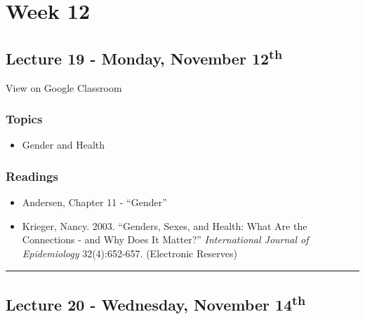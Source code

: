 \documentclass[]{book}
\providecommand{\tightlist}{%
  \setlength{\itemsep}{0pt}\setlength{\parskip}{0pt}}
\theoremstyle{definition}
\theoremstyle{definition}
\theoremstyle{definition}
\theoremstyle{remark}
\begin{document}
\hypertarget{week-12}{%
\section*{Week 12}\label{week-12}}

\hypertarget{lecture-19---monday-november-12th}{%
\subsection*{\texorpdfstring{Lecture 19 - Monday, November
12\textsuperscript{th}}{Lecture 19 - Monday, November 12th}}\label{lecture-19---monday-november-12th}}

View on Google Classroom

\hypertarget{topics-22}{%
\subsubsection*{Topics}\label{topics-22}}

\begin{itemize}
\tightlist
\item
  Gender and Health
\end{itemize}

\hypertarget{readings-20}{%
\subsubsection*{Readings}\label{readings-20}}

\begin{itemize}
\tightlist
\item
  Andersen, Chapter 11 - ``Gender''
\item
  Krieger, Nancy. 2003. ``Genders, Sexes, and Health: What Are the
  Connections - and Why Does It Matter?'' \emph{International Journal of
  Epidemiology} 32(4):652-657. (Electronic Reserves)
\end{itemize}

\begin{center}\rule{0.5\linewidth}{\linethickness}\end{center}

\hypertarget{lecture-20---wednesday-november-14th}{%
\subsection*{\texorpdfstring{Lecture 20 - Wednesday, November
14\textsuperscript{th}}{Lecture 20 - Wednesday, November 14th}}\label{lecture-20---wednesday-november-14th}}
\end{document}
